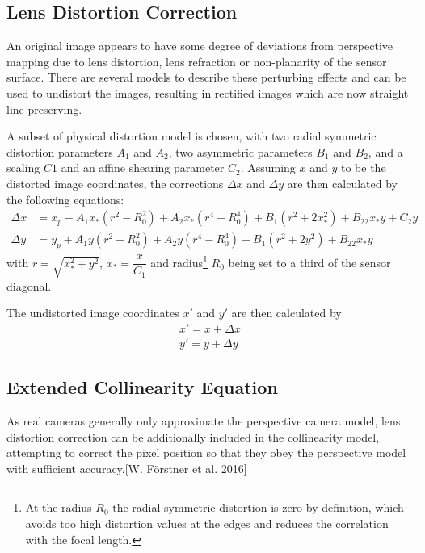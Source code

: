 \subsection{Lens Distortion Correction}
\label{subsec:LensDistortion}

An original image appears to have some degree of deviations from perspective mapping due to lens distortion, lens refraction or non-planarity of the sensor surface. There are several models to describe these perturbing effects and can be used to undistort the images, resulting in rectified images which are now straight line-preserving.
 
A subset of physical distortion model \cite{Fraser1997} is chosen, with two radial symmetric distortion parameters $A_1$ and $A_2$, two asymmetric parameters $B_1$ and $B_2$, and a scaling $C1$ and an affine shearing parameter $C_2$. Assuming $x$ and $y$ to be the distorted image coordinates, the corrections $\Delta x$ and $\Delta y$ are then calculated by the following equations:
\begin{equation} \label{eq:LensDistortion}
\begin{split}
\Delta x &= x_p + A_1x_*(r^2-R_0^2) + A_2x_*(r^4-R_0^4) + B_1(r^2+2x_*^2) + B_22x_*y+C_2y \\
\Delta y &= y_p + A_1y  (r^2-R_0^2) + A_2y  (r^4-R_0^4) + B_1(r^2+2y^2)   + B_22x_*y
\end{split}
\end{equation}
with $r=\sqrt{x_*^2+y^2}$, $x_*=\dfrac{x}{C_1}$ and radius\footnote{At the radius $R_0$ the radial symmetric distortion is zero by definition, which avoids too high distortion values at the edges and reduces the correlation with the focal length.} $R_0$ being set %
to a third of the sensor diagonal.

The undistorted image coordinates $x\prime$ and $y\prime$ are then calculated by
\begin{equation} \label{eq:undistortedimgcoord}
\begin{split}
x\prime=x+\Delta x \\
y\prime=y+\Delta y
\end{split}
\end{equation}

\subsection{Extended Collinearity Equation}
\label{subsec:ExtendedCollinearity}
As real cameras generally only approximate the perspective camera model, lens distortion correction can be additionally included in the collinearity model, attempting to correct the pixel position so that they obey the perspective model with sufficient accuracy.[W. Förstner et al. 2016]%

